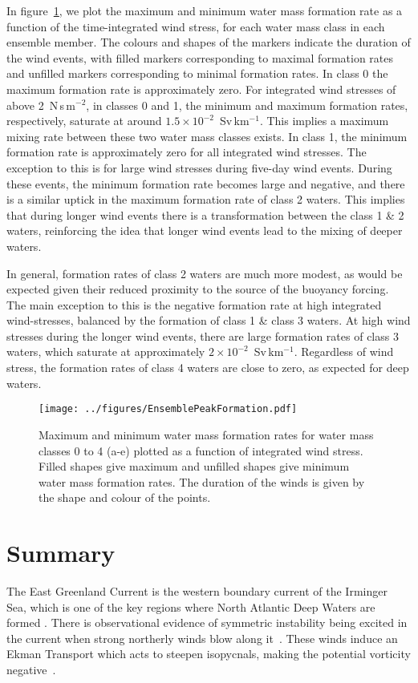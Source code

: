 In figure~\ref{fig:EnsPkFormation}, we plot the maximum and minimum water mass formation rate as a function of the time-integrated wind stress, for each water mass class in each ensemble member. The colours and shapes of the markers indicate the duration of the wind events, with filled markers corresponding to maximal formation rates and unfilled markers corresponding to minimal formation rates. In class 0 the maximum formation rate is approximately zero. For integrated wind stresses of above 2~N\,s\,m$^{-2}$, in classes 0 and 1, the minimum and maximum formation rates, respectively, saturate at around $1.5 \times 10^{-2}$~Sv\,km$^{-1}$. This implies a maximum mixing rate between these two water mass classes exists. In class 1, the minimum formation rate is approximately zero for all integrated wind stresses. The exception to this is for large wind stresses during five-day wind events. During these events, the minimum formation rate becomes large and negative, and there is a similar uptick in the maximum formation rate of class 2 waters. This implies that during longer wind events there is a transformation between the class 1 \& 2 waters, reinforcing the idea that longer wind events lead to the mixing of deeper waters.

In general, formation rates of class 2 waters are much more modest, as would be expected given their reduced proximity to the source of the buoyancy forcing. The main exception to this is the negative formation rate at high integrated wind-stresses, balanced by the formation of class 1 \& class 3 waters. At high wind stresses during the longer wind events, there are large formation rates of class 3 waters, which saturate at approximately $2 \times 10^{-2}$~Sv\,km$^{-1}$. Regardless of wind stress, the formation rates of class 4 waters are close to zero, as expected for deep waters.

\begin{figure} 
    \centering
    \texttt{[image: ../figures/EnsemblePeakFormation.pdf]}
    \caption{Maximum and minimum water mass formation rates for water mass classes 0 to 4 (a-e) plotted as a function of integrated wind stress. Filled shapes give maximum and unfilled shapes give minimum water mass formation rates. The duration of the winds is given by the shape and colour of the points.}
    \label{fig:EnsPkFormation}
\end{figure}


\section{Summary}
\label{sec:IrmConc}
The East Greenland Current is the western boundary current of the Irminger Sea, which is one of the key regions where North Atlantic Deep Waters are formed \citep{Lozier2019}. There is observational evidence of symmetric instability being excited in the current when strong northerly winds blow along it~\citep{LeBras2022}. These winds induce an Ekman Transport which acts to steepen isopycnals, making the potential vorticity negative~\citep[e.g.][]{Straneo2002}.


